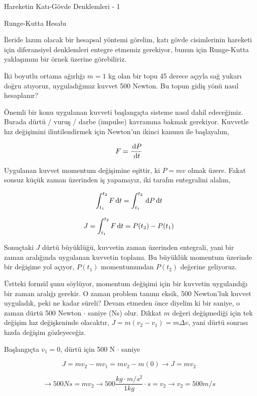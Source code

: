 \documentclass[12pt,fleqn]{article}\usepackage{../../common}
\begin{document}
Hareketin Katı-Gövde Denklemleri - 1

Runge-Kutta Hesabı

İleride lazım olacak bir hesapsal yöntemi görelim, katı gövde cisimlerinin
hareketi için diferansiyel denklemleri entegre etmemiz gerekiyor, bunun
için Runge-Kutta yaklaşımını bir örnek üzerine görebiliriz.

İki boyutlu ortama ağırlığı $m=1$ kg olan bir topu 45 derece açıyla sağ yukarı
doğru atıyoruz, uyguladığımız kuvvet 500 Newton. Bu topun gidiş yönü nasıl
hesaplanır?

Önemli bir konu uygulanan kuvveti başlangıçta sisteme nasıl dahil edeceğimiz.
Burada dürtü / vuruş / darbe (impulse) kavramına bakmak gerekiyor. Kuvvetle hız
değişimini ilintilendirmek için Newton'un ikinci kanunu ile başlayalım,

$$
F = \frac{\,\mathrm{d} P}{\,\mathrm{d} t} 
$$

Uygulanan kuvvet momentum değişimine eşittir, ki $P = mv$ olmak üzere. Fakat
sonsuz küçük zaman üzerinden iş yapamayız, iki tarafın entegralini alalım,

$$
\int_{t_1}^{t_2} F \,\mathrm{d} t = \int_{t_1}^{t_2} \,\mathrm{d} P \,\mathrm{d} t
$$

$$
J = \int_{t_1}^{t_2} F \,\mathrm{d} t = P(t_2) - P(t_1)
$$

Sonuçtaki $J$ dürtü büyüklüğü, kuvvetin zaman üzerinden entegrali, yani
bir zaman aralığında uygulanan kuvvetin toplamı. Bu büyüklük momentum
üzerinde bir değişime yol açıyor, $P(t_1)$ momentumundan $P(t_2)$
değerine geliyoruz.

Üstteki formül şunu söylüyor, momentum değişimi için bir kuvvetin uygulandığı
bir zaman aralığı gerekir. O zaman problem tanımı eksik, 500 Newton'luk kuvvet
uyguladık, peki ne kadar süreli? Devam etmeden önce diyelim ki bir saniye, o
zaman dürtü 500 Newton $\cdot$ saniye (Ns) olur. Dikkat $m$ değeri değişmediği
için tek değişim hız değişkeninde olacaktır, $J = m(v_2 - v_1) = m \Delta v$,
yani dürtü sonrası hızda değişim gözleyeceğiz.

Başlangıçta $v_1=0$, dürtü için 500 N $\cdot$ saniye

$$
J = m v_2 - m v_1 = m v_2 - m(0) \to J = m v_2
$$

$$
\to 500 Ns = m v_2
\to 500 \frac{kg \cdot m/s^2}{1 kg } \cdot s = v_2
\to v_2 = 500 m/s
$$
\end{document}
